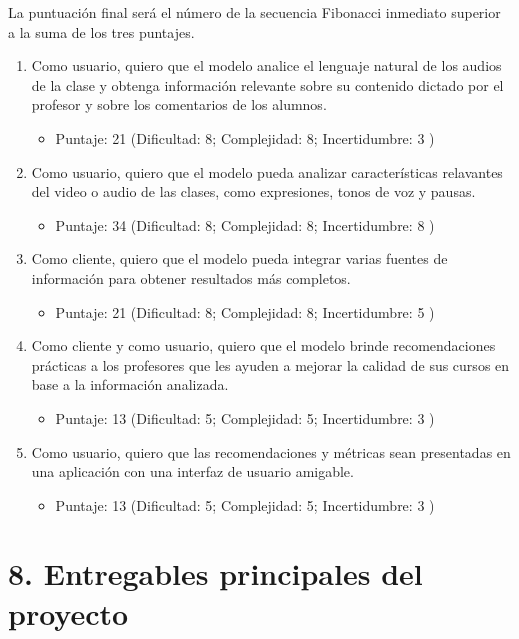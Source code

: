 \documentclass[
11pt, %
codirector, %
]{charter}
\begin{document}
La puntuación final será el número de la secuencia Fibonacci inmediato superior a la suma de los tres puntajes.

\begin{enumerate}
	\item Como usuario, quiero que el modelo analice el lenguaje natural de los audios de la clase y obtenga información relevante sobre su contenido dictado por el profesor y sobre los comentarios de los alumnos.
	\begin{itemize}
		\item Puntaje: 21 (Dificultad: 8; Complejidad: 8; Incertidumbre: 3 )
	\end{itemize}
	\item Como usuario, quiero que el modelo pueda analizar características relavantes del video o audio de las clases, como expresiones, tonos de voz y pausas.
	\begin{itemize}
		\item Puntaje: 34 (Dificultad: 8; Complejidad: 8; Incertidumbre: 8 )
	\end{itemize}
	\item Como cliente, quiero que el modelo pueda integrar varias fuentes de información para obtener resultados más completos.
	\begin{itemize}
		\item Puntaje: 21 (Dificultad: 8; Complejidad: 8; Incertidumbre: 5 )
	\end{itemize}
	\item Como cliente y como usuario, quiero que el modelo brinde recomendaciones prácticas a los profesores que les ayuden a mejorar la calidad de sus cursos en base a la información analizada.
	\begin{itemize}
		\item Puntaje: 13 (Dificultad: 5; Complejidad: 5; Incertidumbre: 3 )
	\end{itemize}
	\item Como usuario, quiero que las recomendaciones y métricas sean presentadas en una aplicación con una interfaz de usuario amigable.
	\begin{itemize}
		\item Puntaje: 13 (Dificultad: 5; Complejidad: 5; Incertidumbre: 3 )
	\end{itemize}
\end{enumerate}

\section{8. Entregables principales del proyecto}
\label{sec:entregables}
\end{document}
